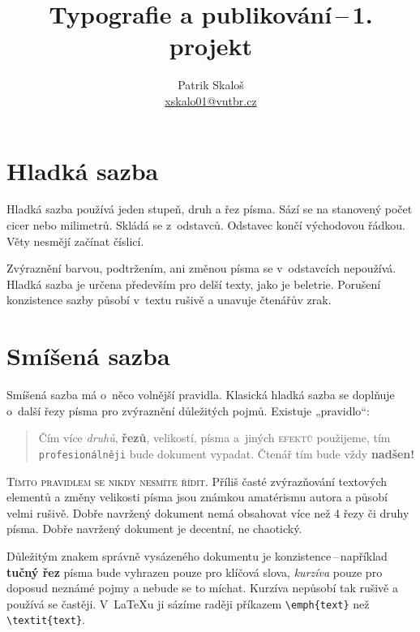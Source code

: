 \documentclass[a4paper, 10pt, twocolumn]{article}
\title{Typografie a publikování\,--\,1. projekt}
\author{Patrik Skaloš \\ \href{mailto:xskalo01@vutbr.cz}{xskalo01@vutbr.cz}}
\date{}
\begin{document}
    \maketitle

    \section{Hladká sazba}
    Hladká sazba používá jeden stupeň, druh a řez písma.
    Sází se na stanovený počet cicer nebo milimetrů.
    Skládá se z~odstavců. Odstavec končí východovou řádkou.
    Věty nesmějí začínat číslicí.

    Zvýraznění barvou, podtržením, ani změnou písma se
    v~odstavcích nepoužívá. Hladká sazba je určena především
    pro delší texty, jako je beletrie. Porušení konzistence sazby
    působí v~textu rušivě a unavuje čtenářův zrak.

    \section{Smíšená sazba}
    Smíšená sazba má o~něco volnější pravidla. Klasická hladká sazba se
    doplňuje o~další řezy písma pro zvýraznění důležitých pojmů. Existuje „pravidlo“:
    \begin{center}
        \begin{quotation}
            Čím více
            \emph{druhů},
            \textbf{řezů},
            {\tiny velikostí},
            {\color{red}{barev}}
            písma a~jiných
            \textsc{efektů}
            použijeme, tím
            \texttt{profesionálněji}
            bude
            {\Large{}\selectfont dokument}
            vypadat.
            \huge{Č}\LARGE{t}\Large{e}\large{n}\normalsize{á}\small{ř}%
            \footnotesize{ t}\scriptsize{í}\tiny{m}\normalsize{}
            bude vždy \Huge\textbf{nadšen!}\normalsize \\
        \end{quotation}
    \end{center}

    \textsc{Tímto pravidlem se nikdy nesmíte řídit.}
    Příliš časté zvýrazňování textových elementů a změny velikosti písma jsou
    známkou amatérismu autora a působí velmi rušivě. Dobře navržený dokument
    nemá obsahovat více než 4 řezy či druhy písma. Dobře navržený dokument je
    decentní, ne chaotický.

    Důležitým znakem správně vysázeného dokumentu je konzistence\,--\,například
    \textbf{tučný řez}
    písma bude vyhrazen pouze pro klíčová slova,
    \emph{kurzíva}
    pouze pro doposud neznámé pojmy a nebude se to míchat.
    Kurzíva nepůsobí tak rušivě a používá se častěji.
    V~\LaTeX u ji sázíme raději příkazem
    \verb!\emph{text}! než \verb!\textit{text}!.
\end{document}
